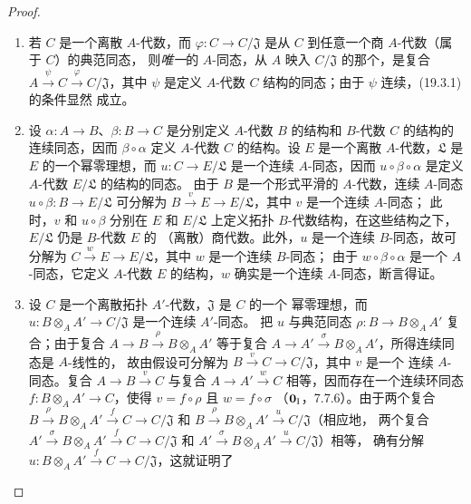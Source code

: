 \begin{proof}
\begin{enumerate}
  \item[(i)] 若 $C$ 是一个离散 $A$-代数，而
  $\varphi:C\to C/\mathfrak J$ 是从 $C$ 到任意一个商 $A$-代数（属于 $C$）的典范同态，
  则\emph{唯一}的 $A$-同态，从 $A$ 映入 $C/\mathfrak J$ 的那个，是复合
  $A\xrightarrow{\psi}C\xrightarrow{\varphi}C/\mathfrak J$，其中 $\psi$
  是定义 $A$-代数 $C$ 结构的同态；由于 $\psi$ 连续，(19.3.1) 的条件显然
  成立。
  \item[(ii)] 设 $\alpha:A\to B$、$\beta:B\to C$ 是分别定义 $A$-代数
  $B$ 的结构和 $B$-代数 $C$ 的结构的连续同态，因而
  $\beta\circ\alpha$ 定义 $A$-代数 $C$ 的结构。设 $E$ 是一个离散
  $A$-代数，$\mathfrak L$ 是 $E$ 的一个幂零理想，而
  $u:C\to E/\mathfrak L$ 是一个连续 $A$-同态，因而
  $u\circ\beta\circ\alpha$ 是定义 $A$-代数 $E/\mathfrak L$ 的结构的同态。
  由于 $B$ 是一个形式平滑的 $A$-代数，连续 $A$-同态
  $u\circ\beta:B\to E/\mathfrak L$ 可分解为
  $B\xrightarrow{v}E\to E/\mathfrak L$，其中 $v$ 是一个连续 $A$-同态；
  此时，$v$ 和 $u\circ\beta$ 分别在 $E$ 和 $E/\mathfrak L$ 上定义拓扑
  $B$-代数结构，在这些结构之下，$E/\mathfrak L$ 仍是 $B$-代数 $E$ 的
  （离散）商代数。此外，$u$ 是一个连续 $B$-同态，故可分解为
  $C\xrightarrow{w}E\to E/\mathfrak L$，其中 $w$ 是一个连续 $B$-同态；
  由于 $w\circ\beta\circ\alpha$ 是一个 $A$-同态，它定义 $A$-代数 $E$ 的结构，$w$
  确实是一个连续 $A$-同态，断言得证。
  \item[(iii)] 设 $C$ 是一个离散拓扑 $A'$-代数，$\mathfrak J$ 是 $C$ 的一个
  幂零理想，而 $u:B\otimes_A A'\to C/\mathfrak J$ 是一个连续 $A'$-同态。
  把 $u$ 与典范同态 $\rho:B\to B\otimes_A A'$ 复合；由于复合
  $A\to B\xrightarrow{\rho}B\otimes_A A'$ 等于复合
  $A\to A'\xrightarrow{\sigma}B\otimes_A A'$，所得连续同态是 $A$-线性的，
  故由假设可分解为 $B\xrightarrow{v}C\to C/\mathfrak J$，其中 $v$ 是一个
  连续 $A$-同态。复合 $A\to B\xrightarrow{v}C$ 与复合
  $A\to A'\xrightarrow{w}C$ 相等，因而存在一个连续环同态
  $f:B\otimes_A A'\to C$，使得 $v=f\circ\rho$ 且 $w=f\circ\sigma$
  （$\mathbf 0_{\rm I}$，7.7.6）。由于两个复合
  $B\xrightarrow{\rho}B\otimes_A A'\xrightarrow{f}C\to C/\mathfrak J$
  和 $B\xrightarrow{\rho}B\otimes_A A'\xrightarrow{u}C/\mathfrak J$（相应地，
  两个复合 $A'\xrightarrow{\sigma}B\otimes_A A'\xrightarrow{f}C\to C/\mathfrak J$
  和 $A'\xrightarrow{\sigma}B\otimes_A A'\xrightarrow{u}C/\mathfrak J$）相等，
  确有分解 $u:B\otimes_A A'\xrightarrow{f}C\to C/\mathfrak J$，这就证明了

\end{enumerate}
\end{proof}
